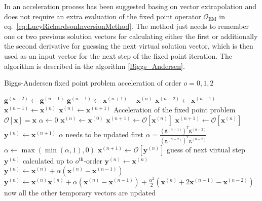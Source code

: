In \cite{Biggs1997, Biggs1995} an acceleration process has been suggested basing on vector extrapolation and does not require an extra evaluation of the fixed point operator $\mathcal{O}_\mathrm{EM}$ in eq.\ \ref{eq:LucyRichardsonInversionMethod}. The method just needs to remember one or two previous solution vectors for calculating either the first or additionally the second derivative for guessing the next virtual solution vector, which is then used as an input vector for the next step of the fixed point iteration. The algorithm is described in the algorithm \ref{Biggs_Andersen}.
\begin{algorithm}[thb]
\caption{Biggs-Andersen  fixed point problem acceleration of order $o=0,1,2$ }\label{Biggs_Andersen}
\begin{algorithmic}[1]
    \State $\mathbf{g}^{(n-2)} \gets \mathbf{g}^{(n-1)}$
    \State $\mathbf{g}^{(n-1)} \gets \mathbf{x}^{(n+1)}-\mathbf{x}^{(n)}$
    \State $\mathbf{x}^{(n-2)} \gets \mathbf{x}^{(n-1)}$
    \State $\mathbf{x}^{(n-1)} \gets \mathbf{x}^{(n)}$
    \State $\mathbf{x}^{(n)} \gets \mathbf{x}^{(n+1)}$
\EndProcedure
\State \Comment Acceleration of the fixed point problem $\mathcal{O}[\mathbf{x}]=\mathbf{x}$
\State $\alpha \gets 0$
\State $\mathbf{x}^{(n)} \gets \mathbf{x}^{(0)}$
\State $\mathbf{x}^{(n+1)} \gets \mathcal{O}[\mathbf{x}^{(n)}]$
\State {}
\State $\mathbf{x}^{(n+1)} \gets \mathcal{O}[\mathbf{x}^{(n)}]$
\State {}
\State $\mathbf{y}^{(n)} \gets  \mathbf{x}^{(n+1)}$
    \State \Comment $\alpha$ needs to be updated first
    \State $\alpha = \frac{\left(\mathbf{g}^{(n-1)}\right)^T\mathbf{g}^{(n-2)}}{\left(\mathbf{g}^{(n-2)}\right)^T\mathbf{g}^{(n-2)}}$
    \State $\alpha \gets \max (\min (\alpha,1),0)$
    \State $\mathbf{x}^{(n+1)} \gets \mathcal{O}[\mathbf{y}^{(n)}]$
    \State \Comment  guess of next virtual step $\mathbf{y}^{(n)}$ calculated up to $o^\mathrm{th}$-order
        \State $\mathbf{y}^{(n)} \gets \mathbf{x}^{(n)}$
        \State $\mathbf{y}^{(n)} \gets \mathbf{x}^{(n)} + \alpha \left(\mathbf{x}^{(n)}-\mathbf{x}^{(n-1)}\right)$
    \Else
        \State $\mathbf{y}^{(n)} \gets \mathbf{x}^{(n)}\mathbf{x}^{(n)} + \alpha \left(\mathbf{x}^{(n)}-\mathbf{x}^{(n-1)}\right)
                                                                        + \frac{\alpha^2}{2}\left(\mathbf{x}^{(n)}+2\mathbf{x}^{(n-1)}-\mathbf{x}^{(n-2)}\right)$
    \EndIf
    \State \Comment now all the other temporary vectors are updated
    \State {}


\end{algorithmic}
\end{algorithm}
